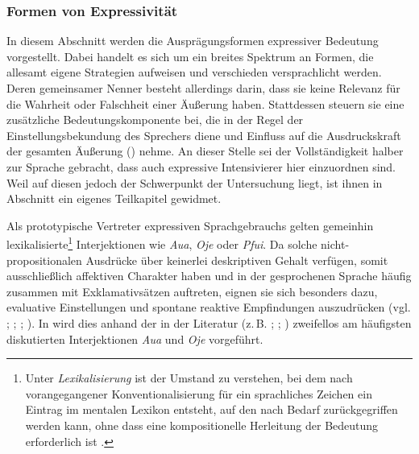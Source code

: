 \subsubsection{Formen von Expressivität} \label{Formen}
In diesem Abschnitt werden die Ausprägungsformen expressiver Bedeutung vorgestellt. Dabei handelt es sich um ein breites Spektrum an Formen, die allesamt eigene Strategien aufweisen und verschieden versprachlicht werden. Deren gemeinsamer Nenner besteht allerdings darin, dass sie keine Relevanz für die Wahrheit oder Falschheit einer Äußerung haben. Stattdessen steuern sie eine zusätzliche Bedeutungskomponente bei, die in der Regel der Einstellungsbekundung des Sprechers diene und Einfluss \glqq{}auf die Ausdruckskraft der gesamten Äußerung\grqq{} ({\citealt[215]{Buthke.2014}}) nehme. An dieser Stelle sei der Vollständigkeit halber zur Sprache gebracht, dass auch expressive Intensivierer hier einzuordnen sind. Weil auf diesen jedoch der Schwerpunkt der Untersuchung liegt, ist ihnen in Abschnitt {} ein eigenes {Teilkapitel gewidmet}.


Als prototypische Vertreter expressiven Sprachgebrauchs gelten gemeinhin lexikalisierte\footnote{Unter \textit{Lexikalisierung} ist der Umstand zu verstehen, bei dem nach vorangegangener Konventionalisierung für ein sprachliches Zeichen ein Eintrag im mentalen Lexikon entsteht, auf den nach Bedarf zurückgegriffen werden kann, ohne dass eine kompositionelle Herleitung der Bedeutung erforderlich ist \citep[vgl.][1263]{Lehmann.1995}.} Interjektionen wie \textit{Aua}, \textit{Oje} oder \textit{Pfui}. Da solche nicht-propositionalen Ausdrücke über keinerlei deskriptiven Gehalt verfügen, somit ausschließlich affektiven Charakter haben und in der gesprochenen Sprache häufig zusammen mit Exklamativsätzen auftreten, eignen sie sich besonders dazu, evaluative Einstellungen und spontane reaktive Empfindungen auszudrücken (vgl. \citealt[189]{Paul.1880}; {\citealt[153]{Zifonun.1997}}; \citealt[58]{Drescher.2003}; \citealt[13]{Nuebling.2004b}). In  wird dies anhand der in der Literatur (z.\,B. \citealt[]{Hayner.1956}; \citealt[]{Kaplan.1997}; {\citealt[]{Kratzer.1999}}) zweifellos am häufigsten diskutierten Interjektionen \textit{Aua} und \textit{Oje} vorgeführt.

